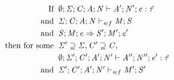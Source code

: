\begin{lemma}[Preservation]
  \label{lemma:preservation}
  \begin{displaymath}
    \begin{aligned}
      \text{If} \;\; & \emptyset;\mathit{\Sigma};\mathit{C};\mathit{A};\mathit{N} \vdash \mathit{A}';\mathit{N}';\mathit{e} : \mathit{\hat{\tau}} \\
      \text{and} \;\; & \mathit{\Sigma};\mathit{C};\mathit{A};\mathit{N} \vdash_{wf} \mathit{M};\mathit{S}\\
      \text{and} \;\; & \mathit{S};\mathit{M};\mathit{e} \Rightarrow \mathit{S}';\mathit{M}';\mathit{e}' \\
      \text{then for some} \;\; & \mathit{\Sigma}' \supseteq \mathit{\Sigma}, \mathit{C}' \supseteq \mathit{C} ,\\
      & \emptyset;\mathit{\Sigma}';\mathit{C}';\mathit{A}';\mathit{N}' \vdash \mathit{A}'';\mathit{N}'';\mathit{e}' : \mathit{\hat{\tau}} \\
      \text{and} \;\; & \mathit{\Sigma}';\mathit{C}';\mathit{A}';\mathit{N}' \vdash_{wf} \mathit{M}';\mathit{S}'\\
    \end{aligned}
  \end{displaymath}
\end{lemma}
